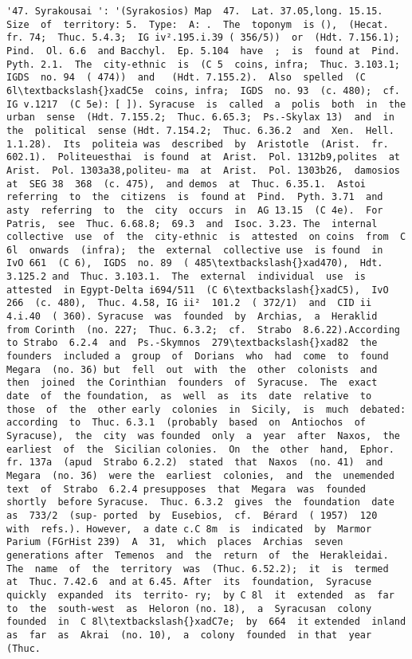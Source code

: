 \documentclass[11pt]{article}
\begin{document}
\begin{Verbatim}[commandchars=\\\{\}]
         '47. Syrakousai ': '(Syrakosios) Map  47.  Lat. 37.05,long. 15.15.  Size  of  territory: 5.  Type:  A: .  The  toponym  is (),  (Hecat.  fr. 74;  Thuc. 5.4.3;  IG iv².195.i.39 ( 356/5))  or  (Hdt. 7.156.1);  Pind.  Ol. 6.6  and Bacchyl.  Ep. 5.104  have  ;  is  found at  Pind.  Pyth. 2.1.  The  city-ethnic  is  (C 5  coins, infra;  Thuc. 3.103.1;  IGDS  no. 94  ( 474))  and   (Hdt. 7.155.2).  Also  spelled  (C 6l\textbackslash{}xadC5e  coins, infra;  IGDS  no. 93  (c. 480);  cf.  IG v.1217  (C 5e): [ ]). Syracuse  is  called  a  polis  both  in  the  urban  sense  (Hdt. 7.155.2;  Thuc. 6.65.3;  Ps.-Skylax 13)  and  in  the  political  sense (Hdt. 7.154.2;  Thuc. 6.36.2  and  Xen.  Hell. 1.1.28).  Its  politeia was  described  by  Aristotle  (Arist.  fr. 602.1).  Politeuesthai  is found  at  Arist.  Pol. 1312b9,polites  at  Arist.  Pol. 1303a38,politeu- ma  at  Arist.  Pol. 1303b26,  damosios  at  SEG 38  368  (c. 475),  and demos  at  Thuc. 6.35.1.  Astoi  referring  to  the  citizens  is  found at  Pind.  Pyth. 3.71  and  asty  referring  to  the  city  occurs  in  AG 13.15  (C 4e).  For  Patris,  see  Thuc. 6.68.8;  69.3  and  Isoc. 3.23. The  internal  collective  use  of  the  city-ethnic  is  attested  on coins  from  C 6l  onwards  (infra);  the  external  collective use  is found  in  IvO 661  (C 6),  IGDS  no. 89  ( 485\textbackslash{}xad470),  Hdt. 3.125.2 and  Thuc. 3.103.1.  The  external  individual  use  is  attested  in Egypt-Delta i694/511  (C 6\textbackslash{}xadC5),  IvO 266  (c. 480),  Thuc. 4.58, IG ii²  101.2  ( 372/1)  and  CID ii  4.i.40  ( 360). Syracuse  was  founded  by  Archias,  a  Heraklid  from Corinth  (no. 227;  Thuc. 6.3.2;  cf.  Strabo  8.6.22).According  to Strabo  6.2.4  and  Ps.-Skymnos  279\textbackslash{}xad82  the  founders  included a  group  of  Dorians  who  had  come  to  found  Megara  (no. 36) but  fell  out  with  the  other  colonists  and  then  joined  the Corinthian  founders  of  Syracuse.  The  exact  date  of  the foundation,  as  well  as  its  date  relative  to  those  of  the  other early  colonies  in  Sicily,  is  much  debated:  according  to  Thuc. 6.3.1  (probably  based  on  Antiochos  of  Syracuse),  the  city  was founded  only  a  year  after  Naxos,  the  earliest  of  the  Sicilian colonies.  On  the  other  hand,  Ephor.  fr. 137a  (apud  Strabo 6.2.2)  stated  that  Naxos  (no. 41)  and  Megara  (no. 36)  were the  earliest  colonies,  and  the  unemended  text  of  Strabo  6.2.4 presupposes  that  Megara  was  founded  shortly  before Syracuse.  Thuc. 6.3.2  gives  the  foundation  date  as  733/2  (sup- ported  by  Eusebios,  cf.  Bérard  ( 1957)  120  with  refs.). However,  a date c.C 8m  is  indicated  by  Marmor  Parium (FGrHist 239)  A  31,  which  places  Archias  seven  generations after  Temenos  and  the  return  of  the  Herakleidai. The  name  of  the  territory  was  (Thuc. 6.52.2);  it  is  termed  at  Thuc. 7.42.6  and at 6.45. After  its  foundation,  Syracuse  quickly  expanded  its  territo- ry;  by C 8l  it  extended  as  far  to  the  south-west  as  Heloron (no. 18),  a  Syracusan  colony  founded  in  C 8l\textbackslash{}xadC7e;  by  664  it extended  inland  as  far  as  Akrai  (no. 10),  a  colony  founded  in that  year  (Thuc. 
\end{Verbatim}
\end{document}
